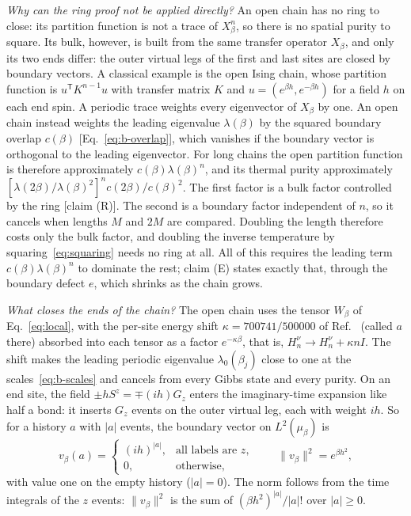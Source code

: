 \documentclass[aps,prl,reprint,amsmath,amssymb,nofootinbib,raggedbottom]{revtex4-2}
\begin{document}
\emph{Why can the ring proof not be applied directly?} An open chain
\tnchain[node=xvertex,caps]{,\cdots,} has no ring to close: its partition
function is not a trace of $X_\beta^n$, so there is no spatial purity to
square. Its bulk, however, is built from the same transfer operator $X_\beta$,
and only its two ends differ: the outer virtual legs of the first and last
sites are closed by boundary vectors. A classical example is the open Ising
chain, whose partition function is $u^{\mathsf T}K^{n-1}u$ with transfer matrix
$K$ and $u=(e^{\beta h},e^{-\beta h})$ for a field $h$ on each end spin.
A periodic trace \tnchain[node=xvertex,ring]{,\cdots,} weights every
eigenvector of $X_\beta$ by one. An open chain instead weights the leading
eigenvalue $\lambda(\beta)$ by the squared boundary overlap $c(\beta)$
[Eq.~\eqref{eq:b-overlap}], which vanishes if the boundary vector is
orthogonal to the leading eigenvector. For long chains the open partition
function is therefore approximately $c(\beta)\lambda(\beta)^n$, and its thermal
purity approximately $[\lambda(2\beta)/\lambda(\beta)^2]^n c(2\beta)/c(\beta)^2$.
The first factor is a bulk factor controlled by the ring [claim (R)]. The
second is a boundary factor independent of $n$, so it cancels when lengths $M$
and $2M$ are compared. Doubling the length therefore costs only the bulk
factor, and doubling the inverse temperature by squaring~\eqref{eq:squaring}
needs no ring at all. All of this requires the leading term
$c(\beta)\lambda(\beta)^n$ to dominate the rest; claim (E) states exactly that,
through the boundary defect $e$, which shrinks as the chain grows.

\emph{What closes the ends of the chain?} The open chain uses the tensor
$W_\beta$ of Eq.~\eqref{eq:local}, with the per-site energy shift
$\kappa=700741/500000$ of Ref.~\cite{boundary} (called $a$ there) absorbed into
each tensor as a factor $e^{-\kappa\beta}$, that is,
$H_n^\nu\to H_n^\nu+\kappa nI$. The shift makes the leading periodic eigenvalue
$\lambda_0(\beta_j)$ close to one at the scales~\eqref{eq:b-scales} and cancels
from every Gibbs state and every purity. On an end site, the field
$\pm hS^z=\mp(ih)G_z$ enters the imaginary-time expansion like half a bond: it
inserts $G_z$ events on the outer virtual leg, each with weight $ih$. So for a
history $a$ with $|a|$ events, the boundary vector on $L^2(\mu_\beta)$ is
\begin{equation}
 v_\beta(a)=
 \begin{cases}(ih)^{|a|},&\text{all labels are }z,\\0,&\text{otherwise},
 \end{cases}
 \qquad \|v_\beta\|^2=e^{\beta h^2},
 \label{eq:b-vector}
\end{equation}
with value one on the empty history ($|a|=0$). The norm follows from the time
integrals of the $z$ events: $\|v_\beta\|^2$ is the sum of
$(\beta h^2)^{|a|}/|a|!$ over $|a|\ge0$.
\end{document}
